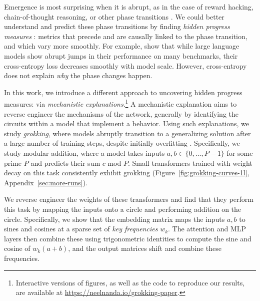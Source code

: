 \documentclass{article} %
\begin{document}
Emergence is most surprising when it is abrupt, as in the case of reward hacking, chain-of-thought reasoning, or other {phase transitions} \citep{ganguli2022predictability, wei2022emergent}.
We could better understand and predict these phase transitions by finding \emph{hidden progress measures} \citep{barak2022hidden}: metrics that precede and are causally linked to the phase transition, and which vary more smoothly. For example, \cite{wei2022emergent} show that while large language models show abrupt jumps in their performance on many benchmarks, their cross-entropy loss decreases smoothly with model scale. However, cross-entropy does not explain \textit{why} the phase changes happen. %

In this work, we introduce a different approach to uncovering hidden progress measures: via \emph{mechanistic explanations}.\footnote{Interactive versions of figures, as well as the code to reproduce our results, are available at \url{https://neelnanda.io/grokking-paper}.}
A mechanistic explanation aims to reverse engineer the mechanisms of the network, generally by identifying the circuits \citep{cammarata2020thread, elhage2021mathematical}
within a model that implement a behavior.
Using such explanations, we study \emph{grokking}, where models abruptly transition to a generalizing solution after a large number of training steps, despite initially overfitting \citep{power2022grokking}.
Specifically, we study modular addition, where a model takes inputs $a, b \in \{0, \ldots, P-1\}$ for some prime $P$ and predicts their sum $c$ mod $P$.
Small transformers trained with weight decay on this task consistently exhibit grokking (Figure~\ref{fig:grokking-curves-1l}, Appendix~\ref{sec:more-runs}).

We reverse engineer the weights of these transformers and find that they perform this task by mapping the inputs onto a circle and performing addition on the circle. Specifically, we show that the embedding matrix maps the inputs $a, b$ to sines and cosines at a sparse set of \textit{key frequencies} $w_k$. The attention and MLP layers then combine these using trigonometric identities to compute the sine and cosine of $w_k(a+b)$, and the output matrices shift and combine these frequencies. %
\end{document}

